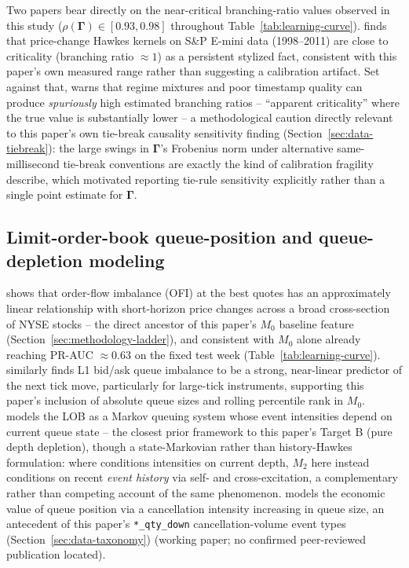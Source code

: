Two papers bear directly on the near-critical branching-ratio values
observed in this study ($\rho(\boldsymbol\Gamma) \in [0.93, 0.98]$
throughout Table~\ref{tab:learning-curve}).
\citet{hardiman2013critical} finds that price-change Hawkes kernels on
S\&P E-mini data (1998--2011) are close to criticality (branching ratio
$\approx 1$) as a persistent stylized fact, consistent with this paper's
own measured range rather than suggesting a calibration artifact. Set
against that, \citet{filimonov2015apparent} warns that regime mixtures
and poor timestamp quality can produce \emph{spuriously} high estimated
branching ratios -- ``apparent criticality'' where the true value is
substantially lower -- a methodological caution directly relevant to
this paper's own tie-break causality sensitivity finding
(Section~\ref{sec:data-tiebreak}): the large swings in
$\boldsymbol\Gamma$'s Frobenius norm under alternative same-millisecond
tie-break conventions are exactly the kind of calibration fragility
\citeauthor{filimonov2015apparent} describe, which motivated reporting
tie-rule sensitivity explicitly rather than a single point estimate for
$\boldsymbol\Gamma$.

\subsection{Limit-order-book queue-position and queue-depletion modeling}
\label{sec:rw-lob}

\citet{cont2014price} shows that order-flow imbalance (OFI) at the best
quotes has an approximately linear relationship with short-horizon price
changes across a broad cross-section of NYSE stocks -- the direct
ancestor of this paper's $M_0$ baseline feature
(Section~\ref{sec:methodology-ladder}), and consistent with $M_0$ alone
already reaching PR-AUC $\approx 0.63$ on the fixed test week
(Table~\ref{tab:learning-curve}). \citet{gould2016queue} similarly finds
L1 bid/ask queue imbalance to be a strong, near-linear predictor of the
next tick move, particularly for large-tick instruments, supporting this
paper's inclusion of absolute queue sizes and rolling percentile rank in
$M_0$. \citet{huang2015simulating} models the LOB as a Markov
queuing system whose event intensities depend on current queue state --
the closest prior framework to this paper's Target B (pure depth
depletion), though a state-Markovian rather than history-Hawkes
formulation: where \citet{huang2015simulating} conditions intensities on
current depth, $M_2$ here instead conditions on recent \emph{event
history} via self- and cross-excitation, a complementary rather than
competing account of the same phenomenon.
\citet{moallemi2017queue} models the economic value of queue position via
a cancellation intensity increasing in queue size, an antecedent of this
paper's \texttt{*\_qty\_down} cancellation-volume event types
(Section~\ref{sec:data-taxonomy}) (working paper; no confirmed
peer-reviewed publication located).

